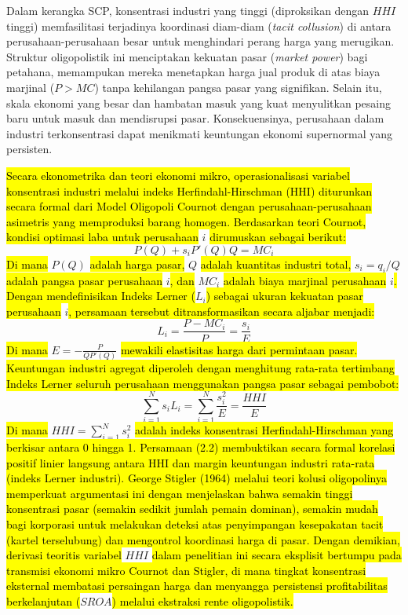 \documentclass[12pt,a4paper]{article}
\begin{document}
Dalam kerangka SCP, konsentrasi industri yang tinggi (diproksikan dengan
\(HHI\) tinggi) memfasilitasi terjadinya koordinasi diam-diam
(\emph{tacit collusion}) di antara perusahaan-perusahaan besar untuk
menghindari perang harga yang merugikan. Struktur oligopolistik ini
menciptakan kekuatan pasar (\emph{market power}) bagi petahana,
memampukan mereka menetapkan harga jual produk di atas biaya marjinal
(\(P > MC\)) tanpa kehilangan pangsa pasar yang signifikan. Selain itu,
skala ekonomi yang besar dan hambatan masuk yang kuat menyulitkan
pesaing baru untuk masuk dan mendisrupsi pasar. Konsekuensinya,
perusahaan dalam industri terkonsentrasi dapat menikmati keuntungan
ekonomi supernormal yang persisten.

\hl{Secara ekonometrika dan teori ekonomi mikro, operasionalisasi variabel konsentrasi industri melalui indeks Herfindahl-Hirschman (HHI) diturunkan secara formal dari Model Oligopoli Cournot dengan perusahaan-perusahaan asimetris yang memproduksi barang homogen. Berdasarkan teori Cournot, kondisi optimasi laba untuk perusahaan }$i$\hl{ dirumuskan sebagai berikut:
}$$P(Q) + s_i P'(Q) Q = MC_i$$\hl{
Di mana }$P(Q)$\hl{ adalah harga pasar, }$Q$\hl{ adalah kuantitas industri total, }$s_i = q_i / Q$\hl{ adalah pangsa pasar perusahaan }$i$\hl{, dan }$MC_i$\hl{ adalah biaya marjinal perusahaan }$i$\hl{. Dengan mendefinisikan Indeks Lerner (}$L_i$\hl{) sebagai ukuran kekuatan pasar perusahaan }$i$\hl{, persamaan tersebut ditransformasikan secara aljabar menjadi:
}$$L_i = \frac{P - MC_i}{P} = \frac{s_i}{E}$$\hl{
Di mana }$E = - \frac{P}{Q P'(Q)}$\hl{ mewakili elastisitas harga dari permintaan pasar. Keuntungan industri agregat diperoleh dengan menghitung rata-rata tertimbang Indeks Lerner seluruh perusahaan menggunakan pangsa pasar sebagai pembobot:
}$$\sum_{i=1}^N s_i L_i = \sum_{i=1}^N \frac{s_i^2}{E} = \frac{HHI}{E}$$\hl{
Di mana }$HHI = \sum_{i=1}^N s_i^2$\hl{ adalah indeks konsentrasi Herfindahl-Hirschman yang berkisar antara 0 hingga 1. Persamaan (2.2) membuktikan secara formal korelasi positif linier langsung antara HHI dan margin keuntungan industri rata-rata (indeks Lerner industri). George Stigler (1964) melalui teori kolusi oligopolinya memperkuat argumentasi ini dengan menjelaskan bahwa semakin tinggi konsentrasi pasar (semakin sedikit jumlah pemain dominan), semakin mudah bagi korporasi untuk melakukan deteksi atas penyimpangan kesepakatan tacit (kartel terselubung) dan mengontrol koordinasi harga di pasar. Dengan demikian, derivasi teoritis variabel }$HHI$\hl{ dalam penelitian ini secara eksplisit bertumpu pada transmisi ekonomi mikro Cournot dan Stigler, di mana tingkat konsentrasi eksternal membatasi persaingan harga dan menyangga persistensi profitabilitas berkelanjutan (}$SROA$\hl{) melalui ekstraksi rente oligopolistik.}
\end{document}
